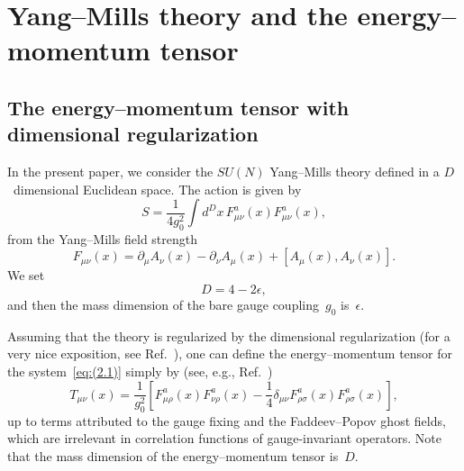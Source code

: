 \section{Yang--Mills theory and the energy--momentum tensor}
\label{sec:2}
\subsection{The energy--momentum tensor with dimensional regularization}
In the present paper, we consider the $SU(N)$ Yang--Mills theory defined in a
$D$~dimensional Euclidean space. The action is given by
\begin{equation}
   S=\frac{1}{4g_0^2}\int d^Dx\,F_{\mu\nu}^a(x)F_{\mu\nu}^a(x),
\label{eq:(2.1)}
\end{equation}
from the Yang--Mills field strength
\begin{equation}
   F_{\mu\nu}(x)
   =\partial_\mu A_\nu(x)-\partial_\nu A_\mu(x)+[A_\mu(x),A_\nu(x)].
\label{eq:(2.2)}
\end{equation}
We set
\begin{equation}
   D=4-2\epsilon,
\label{eq:(2.3)}
\end{equation}
and then the mass dimension of the bare gauge coupling~$g_0$ is~$\epsilon$.

Assuming that the theory is regularized by the dimensional regularization (for
a very nice exposition, see Ref.~\cite{Collins:1984xc}), one can define the
energy--momentum tensor for the system~\eqref{eq:(2.1)} simply by (see, e.g.,
Ref.~\cite{Freedman:1974gs})
\begin{equation}
   T_{\mu\nu}(x)=\frac{1}{g_0^2}
   \left[F_{\mu\rho}^a(x)F_{\nu\rho}^a(x)
   -\frac{1}{4}\delta_{\mu\nu}F_{\rho\sigma}^a(x)F_{\rho\sigma}^a(x)\right],
\label{eq:(2.4)}
\end{equation}
up to terms attributed to the gauge fixing and the Faddeev--Popov ghost fields,
which are irrelevant in correlation functions of gauge-invariant operators.
Note that the mass dimension of the energy--momentum tensor is~$D$.

